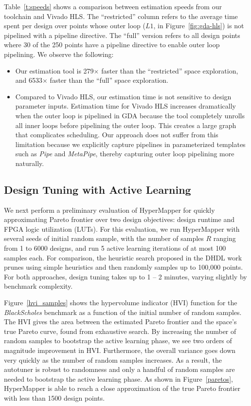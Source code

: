 Table~\ref{t:speeds} shows a comparison between estimation speeds from our toolchain and Vivado HLS.
The ``restricted'' column refers to the average time spent per design over points whose outer loop ($L1$, in Figure~\ref{fig:gda-hls})
is not pipelined with a pipeline directive. The ``full'' version refers to all design points where 30 of the 250 points
have a pipeline directive to enable outer loop pipelining. We observe the following:
\begin{itemize}
  \item Our estimation tool is 279$\times$ faster than the ``restricted'' space exploration, and 6533$\times$ faster than the ``full'' space exploration.
  \item Compared to Vivado HLS, our estimation time is not sensitive to design parameter inputs. Estimation time for Vivado HLS increases
    dramatically when the outer loop is pipelined in GDA because the tool completely unrolls all inner loops
    before pipelining the outer loop. This creates a large graph that complicates scheduling. Our approach does not
    suffer from this limitation because we explicitly capture pipelines in parameterized templates such as \emph{Pipe} and
    \emph{MetaPipe}, thereby capturing outer loop pipelining more naturally.
\end{itemize}

\subsection{Design Tuning with Active Learning}
We next perform a preliminary evaluation of HyperMapper for quickly approximating Pareto frontier over two design objectives: design runtime and FPGA logic utilization (LUTs).
For this evaluation, we run HyperMapper with several seeds of initial random sample, with the number of samples $R$ ranging from 1 to 6000 designs, and run 5 active learning iterations of at most 100 samples each. For comparison, the heuristic search proposed in the DHDL work~\cite{dhdl} prunes using simple heuristics and then randomly samples up to 100,000 points. For both approaches, design tuning takes up to 1 -- 2 minutes, varying slightly by benchmark complexity.

Figure~\ref{hvi_samples} shows the hypervolume indicator (HVI) function
for the \emph{BlackScholes} benchmark as a function of the initial
number of random samples.
The HVI gives the area between the estimated Pareto frontier and the space's true Pareto curve, found from exhaustive search.
By increasing
the number of random samples to bootstrap the active learning phase,
we see two orders
of magnitude improvement in HVI. Furthermore, the overall variance goes down very
quickly as the number of random
samples increases. As a result, the autotuner is robust
to randomness and only a handful of random samples are
needed to bootstrap the active learning phase. As shown in Figure~\ref{paretos},
HyperMapper is able to reach a close approximation of
the true Pareto frontier with less than 1500 design points.

